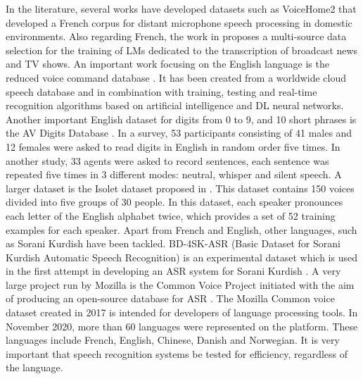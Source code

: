 In the literature, several works have developed datasets such as VoiceHome2  that developed a French corpus for distant microphone speech processing in domestic environments. Also regarding French, the work in  proposes a multi-source data selection for the training of LMs dedicated to the transcription of broadcast news and TV shows.
An important work focusing on the English language is the reduced voice command database . It has been created from a worldwide cloud speech database and in combination with training, testing and real-time recognition algorithms based on artificial intelligence and DL neural networks. Another important English dataset for digits from 0 to 9, and 10 short phrases is the AV Digits Database . In a survey, 53 participants consisting of 41 males and 12 females were asked to read digits in English in random order five times. In another study, 33 agents were asked to record sentences, each sentence was repeated five times in 3 different modes: neutral, whisper and silent speech. A  larger dataset is the Isolet dataset proposed in . This dataset contains  150 voices divided into five groups of 30 people. In this dataset, each speaker pronounces  each letter of the English alphabet twice, which provides a set of 52 training examples for each speaker.
Apart from French and English, other languages, such as Sorani Kurdish have been tackled. BD-4SK-ASR (Basic Dataset for Sorani Kurdish Automatic Speech Recognition) is an experimental dataset which is used in the first attempt in developing an ASR system for Sorani Kurdish .
A very large project run by Mozilla is the Common Voice Project initiated with the aim of producing an open-source database for ASR . The Mozilla Common voice dataset created in 2017 is intended for developers of language processing tools. In November 2020, more than 60 languages were represented on the platform. These languages include French, English, Chinese, Danish and Norwegian.
It is very important that speech recognition systems be tested for efficiency, regardless of the language.

